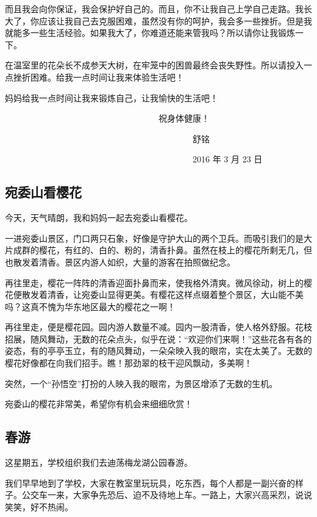 \documentclass[UTF8,a4paper,titlepage,twoside,10.5pt]{article}
\begin{document}
而且我会向你保证，我会保护好自己的。而且，你不让我自己上学自己走路。我长大了，你应该让我自己去克服困难，虽然没有你的呵护，我会多一些挫折。但是我就能多一些生活经验。如果我大了，你难道还能来管我吗？所以请你让我锻炼一下。

在温室里的花朵长不成参天大树，在牢笼中的困兽最终会丧失野性。所以请投入一点挫折困难。给我一点时间让我来体验生活吧！

妈妈给我一点时间让我来锻炼自己，让我愉快的生活吧！

　　　　　　　　　　　　　　　　　　祝身体健康！

　　　　　　　　　　　　　　　　　　　　　　舒铭

　　　　　　　　　　　　　　　　　　　　　　2016 年 3 月 23 日

\subsection{宛委山看樱花}
\label{sec:orgf7f2065}

今天，天气晴朗，我和妈妈一起去宛委山看樱花。

一进宛委山景区，门口两只石象，好像是守护大山的两个卫兵。而吸引我们的是大片成群的樱花，有红的、白的、粉的，清香扑鼻。虽然在枝上的樱花所剩无几，但也散发着清香。景区内游人如织，大量的游客在拍照做纪念。

再往里走，樱花一阵阵的清香迎面扑鼻而来，使我格外清爽。微风徐动，树上的樱花便散发着清香，让宛委山显得更美。有樱花这样点缀着整个景区，大山能不美吗？这真不愧为华东地区最大的樱花之一啊！

再往里走，便是樱花园。园内游人数量不减。园内一股清香，使人格外舒服。花枝招展，随风舞动，无数的花朵点头，似乎在说：“欢迎你们来啊！”这些花各有各的姿态，有的亭亭玉立，有的随风舞动，一朵朵映入我的眼帘，实在太美了。无数的樱花好像都在向我们招手。瞧！那劲翠的枝干迎风飘动，多美啊！

突然，一个“孙悟空”打扮的人映入我的眼帘，为景区增添了无数的生机。

宛委山的樱花非常美，希望你有机会来细细欣赏！

\subsection{春游}
\label{sec:org2540fd9}

这星期五，学校组织我们去迪荡梅龙湖公园春游。

我们早早地到了学校，大家在教室里玩玩具，吃东西，每个人都是一副兴奋的样子。公交车一来，大家争先恐后、迫不及待地上车。一路上，大家兴高采烈，说说笑笑，好不热闹。
\end{document}
